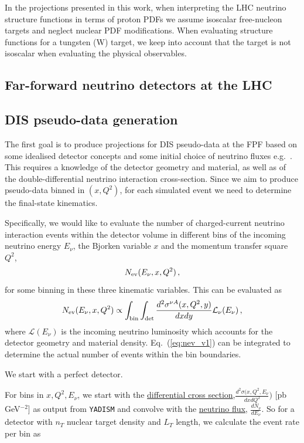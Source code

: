  In the projections presented in this work, when interpreting the LHC neutrino structure
 functions in terms of proton PDFs we assume isoscalar free-nucleon targets and neglect
 nuclear PDF modifications.
 When evaluating structure functions for a tungsten (W) target, we keep into account
 that the target is not isoscalar when evaluating the physical observables.
 

 \subsection{Far-forward neutrino detectors at the LHC}
 \label{sec:neutrinoDetectors}
 

\subsection{DIS pseudo-data generation}
\label{sec:pseudo-data_generation}

The first goal is to produce projections
for DIS pseudo-data at the FPF based on
some idealised detector concepts and
some initial choice of neutrino fluxes
e.g.~\cite{Kling:2021gos}.
%
This requires a knowledge of the detector geometry
and material, as well as of the double-differential
neutrino interaction cross-section. 
%
Since we aim to produce pseudo-data binned in $(x,Q^2)$,
for each simulated event we need to determine the 
final-state kinematics. 

Specifically, we would like to evaluate the
number of charged-current neutrino interaction events
within the detector volume in different bins
of the incoming neutrino energy $E_\nu$, the Bjorken
variable $x$ and the momentum transfer square $Q^2$,
\begin{equation}
    N_{\rm ev}(E_\nu, x, Q^2) \, ,
\end{equation}
for some binning in these three kinematic variables.
%
This can be evaluated as
\begin{equation}
\label{eq:nev_v1}
    N_{\rm ev}(E_\nu, x, Q^2) \propto \int_{\rm bin}\int_{\rm det}  \frac{d^2\sigma^{\nu A}(x,Q^2,y)}{dxdy} \mathcal{L}_{\nu}(E_{\nu}) \, ,
\end{equation}
where $\mathcal{L}(E_{\nu}) $ is the incoming neutrino
luminosity which accounts for the detector geometry
and material density. 
%
Eq.~(\ref{eq:nev_v1}) can be integrated to
determine the actual number of events within
the bin boundaries.

We start with a perfect detector.


For bins in $x,Q^2,E_{\nu}$, we start with the \href{https://github.com/juanrojochacon/FPF-WG1/blob/main/results/diff_xsecs_a1.txt}{differential cross section},$\frac{d^2\sigma(x,Q^2,E_{\nu}}{dxdQ^2})$ [pb GeV$^{-2}$] as output from {\tt YADISM} and convolve with the \href{https://github.com/KlingFelix/FastNeutrinoFluxSimulation/tree/main/Fluxes}{neutrino flux}, $\frac{dN_{\nu}}{dE_{\nu}}$. So for a detector with $n_T$ nuclear target density and $L_T$ length, we calculate the event rate per bin as

